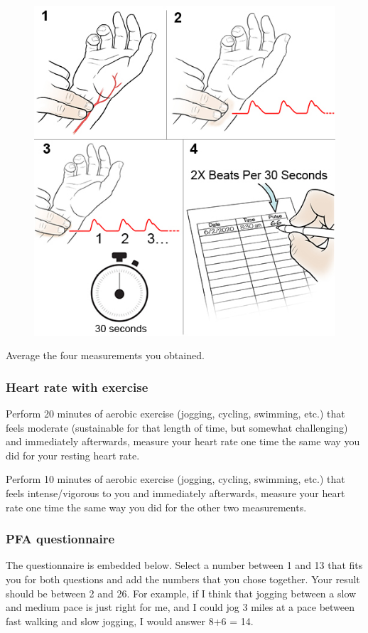 \documentclass{article}
\begin{document}
\begin{figure}[h!]
\centering
\includegraphics[width=0.6\linewidth]{pics/pulse2.jpeg}
\end{figure}

Average the four measurements you obtained.

\subsubsection{Heart rate with exercise}

Perform 20 minutes of aerobic exercise (jogging, cycling, swimming, etc.) that feels moderate (sustainable for that length of time, but somewhat challenging) and immediately afterwards, measure your heart rate one time the same way you did for your resting heart rate.

Perform 10 minutes of aerobic exercise (jogging, cycling, swimming, etc.) that feels intense/vigorous to you and immediately afterwards, measure your heart rate one time the same way you did for the other two measurements.

\subsubsection{PFA questionnaire}
The questionnaire is embedded below. Select a number between 1 and 13 that fits you for both questions and add the numbers that you chose together. Your result should be between 2 and 26. For example, if I think that jogging between a slow and medium pace is just right for me, and I could jog 3 miles at a pace between fast walking and slow jogging, I would answer 8+6 = 14.
\end{document}
